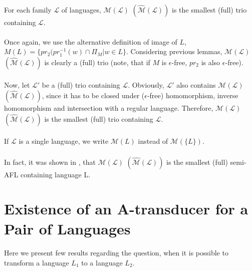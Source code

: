 \paragraph{}
\cveta For each family $\mathcal{L} $ of languages, $\mathcal{M(L)} $ $(\mathcal{\hat{M}(L)}) $ is the smallest (full) trio containing $\mathcal{L} $.

\paragraph{}
\dokaz Once again, we use the alternative definition of image of $L$, $M(L) = \{ pr_{2}(pr_{1}^{-1}(w) \cap \Pi_{M} | w \in L \}$. Considering previous lemmas, $\mathcal{M(L)} $ $(\mathcal{\hat{M}(L)}) $ is clearly a (full) trio (note, that if $M$ is $\epsilon $-free, $pr_{2}$ is also $\epsilon $-free).

\paragraph{}
Now, let $\mathcal{L'} $ be a (full) trio containing $\mathcal{L} $. Obviously, $\mathcal{L'} $ also contains $\mathcal{M(L)} $ $(\mathcal{\hat{M}(L)}) $, since it has to be closed under ($\epsilon $-free) homomorphism, inverse homomorphism and intersection with a regular language. Therefore, $\mathcal{M(L)} $ $(\mathcal{\hat{M}(L)}) $ is the smallest (full) trio containing $\mathcal{L} $. \square

\paragraph{}
\oznacenie If $\mathcal{L}$ is a single language, we write $\mathcal{M}(L)$ instead of $\mathcal{M}(\{ L\} )$.

\paragraph{}
In fact, it was shown in \cite{gingrei:pAFL}, that $\mathcal{M(L)} $ $(\mathcal{\hat{M}(L)}) $ is the smallest (full) semi-AFL containing language L.

\section{Existence of an A-transducer for a Pair of Languages}
\paragraph{}
Here we present few results regarding the question, when it is possible to transform a language $L_{1}$ to a language $L_{2}$.

